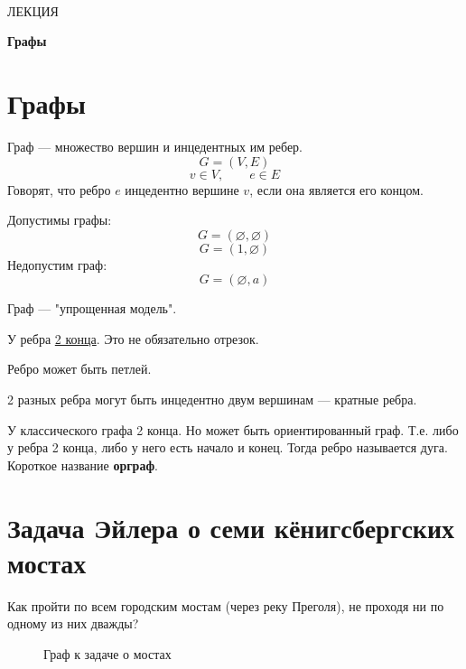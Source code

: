 \documentclass[a4paper,12pt]{article}
\theoremstyle{plain} %
\theoremstyle{definition} %
\theoremstyle{remark} %
\begin{document}
\newcommand{\lec}[1]{\addtocounter{lec}{1} \setcounter{section}{0}%
\begin{center}
{\LARGE ЛЕКЦИЯ %
\vspace{2mm}%

\textbf{#1}%
}
\end{center}
}
\newpage
\
\setcounter{lec}{1}
\lec{Графы}
\section{Графы}
Граф --- множество вершин и инцедентных им ребер.
$$G=(V, E)$$
$$v \in V, \qquad e \in E $$
Говорят, что ребро $e$ инцедентно вершине $v$, если она является его концом.

Допустимы графы:
$$G = (\varnothing, \varnothing)$$
$$G = ({1}, \varnothing)$$
Недопустим граф:
$$G = (\varnothing, {a})$$

Граф --- "упрощенная модель".

У ребра \underline{2 конца}. Это не обязательно отрезок. 

Ребро может быть петлей.

2 разных ребра могут быть инцедентно двум вершинам --- кратные ребра.

У классического графа 2 конца. Но может быть ориентированный граф. Т.е. либо у ребра 2 конца, либо у него есть начало и конец. Тогда ребро называется дуга. Короткое название \textbf{орграф}.

\section{Задача Эйлера о семи кёнигсбергских мостах}
Как пройти по всем городским мостам (через реку Преголя), не проходя ни по одному из них дважды?
\begin{figure}[h!]
	\noindent{}
	\caption{Граф к задаче о мостах}
	\label{fp_2}
	\vspace{-0.5cm}
\end{figure}
\end{document}
